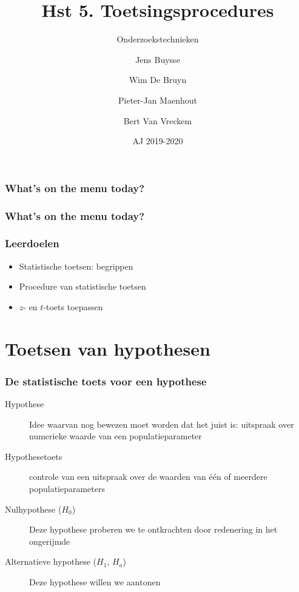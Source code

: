 \documentclass[aspectratio=169]{beamer}
\title{Hst 5. Toetsingsprocedures}
\subtitle{Onderzoekstechnieken}
\author{Jens Buysse \and Wim {De Bruyn} \and Pieter-Jan Maenhout \and Bert {Van Vreckem}}
\date{AJ 2019-2020}
\begin{document}
\begin{frame}
  \maketitle
\end{frame}

\begin{frame}
  \frametitle{What's on the menu today?}
  
  \tableofcontents
\end{frame}

\begin{frame}
  \frametitle{What's on the menu today?}
  
  \tableofcontents
\end{frame}

\begin{frame}
  \frametitle{Leerdoelen}
  
  \begin{itemize}
    \item Statistische toetsen: begrippen
    \item Procedure van statistische toetsen
    \item $z$- en $t$-toets toepassen
  \end{itemize}
\end{frame}


\section{Toetsen van hypothesen}

\begin{frame}
  \frametitle{De statistische toets voor een hypothese}
  
  \begin{description}
    \item[Hypothese] Idee waarvan nog bewezen moet worden dat het juist is: uitspraak over numerieke waarde van een populatieparameter
    \item[Hypothesetoets] controle van een uitspraak over de waarden van één of meerdere populatieparameters
    \item[Nulhypothese ($H_0$)] Deze hypothese proberen we te ontkrachten door redenering in het ongerijmde
    \item[Alternatieve hypothese ($H_1$, $H_a$)] Deze hypothese willen we aantonen
  \end{description}
\end{frame}
\end{document}
